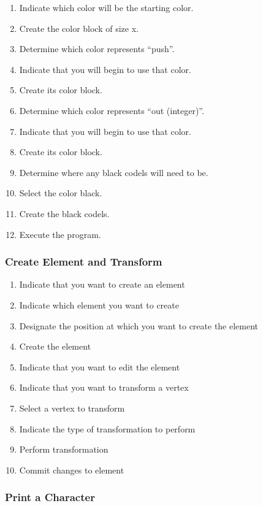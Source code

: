\begin{enumerate}
  \item Indicate which color will be the starting color.
  \item Create the color block of size x.
  \item Determine which color represents ``push''.
  \item Indicate that you will begin to use that color.
  \item Create its color block.
  \item Determine which color represents ``out (integer)''.
  \item Indicate that you will begin to use that color.
  \item Create its color block.
  \item Determine where any black codels will need to be.
  \item Select the color black.
  \item Create the black codels.
  \item Execute the program.
\end{enumerate}

\subsubsection{Create Element and Transform}
\label{app:euc_create_transform}

\begin{enumerate}
  \item Indicate that you want to create an element
  \item Indicate which element you want to create
  \item Designate the position at which you want to create the element
  \item Create the element
  \item Indicate that you want to edit the element
  \item Indicate that you want to transform a vertex
  \item Select a vertex to transform
  \item Indicate the type of transformation to perform
  \item Perform transformation
  \item Commit changes to element
\end{enumerate}

\subsubsection{Print a Character}
\label{app:euc_print_character}

